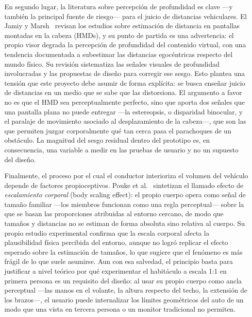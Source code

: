 \documentclass[conference]{IEEEtran}
\begin{document}
En segundo lugar, la literatura sobre percepción de profundidad es clave —y también la principal fuente de riesgo— para el juicio de distancias vehiculares. El Jamiy y Marsh~\cite{eljamiy2019} revisan los estudios sobre estimación de distancia en pantallas montadas en la cabeza (HMDs), y su punto de partida es una advertencia: el propio visor degrada la percepción de profundidad del contenido virtual, con una tendencia documentada a subestimar las distancias egocéntricas respecto del mundo físico. Su revisión sistematiza las señales visuales de profundidad involucradas y las propuestas de diseño para corregir ese sesgo. Esto plantea una tensión que este proyecto debe asumir de forma explícita: se busca enseñar juicio de distancias en un medio que se sabe que las distorsiona. El argumento a favor no es que el HMD sea perceptualmente perfecto, sino que aporta dos señales que una pantalla plana no puede entregar —la estereopsis, o disparidad binocular, y el paralaje de movimiento asociado al desplazamiento de la cabeza—, que son las que permiten juzgar corporalmente qué tan cerca pasa el parachoques de un obstáculo. La magnitud del sesgo residual dentro del prototipo es, en consecuencia, una variable a medir en las pruebas de usuario y no un supuesto del diseño.

Finalmente, el proceso por el cual el conductor interioriza el volumen del vehículo depende de factores propioceptivos. Pouke et al.~\cite{pouke2022} sintetizan el llamado efecto de \textit{escalamiento corporal} (body scaling effect): el propio cuerpo opera como señal de tamaño familiar —los miembros funcionan como una regla perceptual— sobre la que se basan las proporciones atribuidas al entorno cercano, de modo que tamaños y distancias no se estiman de forma absoluta sino relativa al cuerpo. Su propio estudio experimental confirma que la escala corporal afecta la plausibilidad física percibida del entorno, aunque no logró replicar el efecto esperado sobre la estimación de tamaños, lo que sugiere que el fenómeno es más frágil de lo que suele asumirse. Aun con esa salvedad, el principio basta para justificar a nivel teórico por qué experimentar el habitáculo a escala 1:1 en primera persona es un requisito del diseño: al usar su propio cuerpo como ancla perceptual —las manos en el volante, la altura respecto del techo, la extensión de los brazos—, el usuario puede internalizar los límites geométricos del auto de un modo que una vista en tercera persona o un monitor tradicional no permiten.

\end{document}
